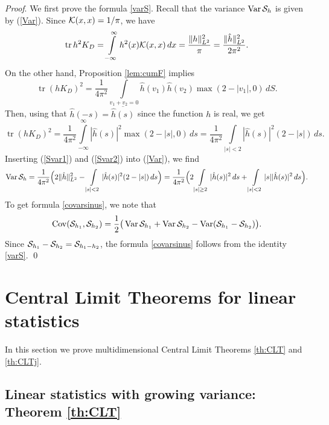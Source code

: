 \documentclass{article}
\numberwithin{equation}{section}
\newcommand{\SSS}{{\cal S}}
\newcommand{\KK}{{\cal K}}
\newcommand{\tr}{\operatorname{tr}}
\newcommand{\Cov}{\operatorname{Cov}}
\newcommand{\Var}{\operatorname{Var}}
\newcommand{\ov}{\overline}
\newcommand{\fr}{\frac}
\newcommand{\ili}{\int\limits}
\newcommand{\ilif}{\ili_{-\infty}^\infty}
\newcommand{\lbl}{\label}
\newcommand{\bee}{\begin{equation}}
\newcommand{\eee}{\end{equation}}
\begin{document}
{\it Proof}. We first prove the formula \eqref{varS}. Recall that the variance $\Var\SSS_{h}$ is given by (\ref{Var}).
Since $\KK(x,x)=1/\pi$, we have
\bee\lbl{Svar1}
\tr h^2 K_D=\ilif h^2(x)\KK(x,x)\,dx=\fr{\|h\|^2_{L^2}}{\pi} = \fr{\|\hat h\|^2_{L^2}}{2\pi^2}.
\eee
On the other hand, Proposition \ref{lem:cumF} implies
$$
\tr (h K_D)^2 = \fr{1}{4\pi^2} \ili_{v_1+v_2=0}\hat h(v_1)\hat h(v_2) \max (2-|v_1|,0)\, dS.
$$
Then, using that $\hat h(-s)=\ov{\hat h(s)}$ since the function $h$ is real, we get
\bee\lbl{Svar2}
\tr (h K_D)^2
=\fr{1}{4\pi^2}\ili_{-\infty}^\infty |\hat h(s)|^2 \max(2-|s|,0) \, ds
= \fr{1}{4\pi^2}\ili_{|s|<2} |\hat h(s)|^2 (2-|s|) \, ds.
\eee
Inserting (\ref{Svar1}) and (\ref{Svar2}) into  (\ref{Var}), we find
$$
\Var\SSS_{h}
= \fr{1}{4\pi^2}
\Big(
2\|\hat h\|^2_{L^2} - \ili_{|s|<2} |\hat h(s)|^2 (2-|s|) \, ds
\Big)
=\fr{1}{4\pi^2}
\Big(
2 \ili_{|s|\geq 2} |\hat h(s)|^2  \, ds + \ili_{|s|<2} |s| |\hat h(s)|^2  \, ds
\Big).
$$
To get formula  \eqref{covarsinus}, we note that
$$
\Cov(\SSS_{h_1},\SSS_{h_2})=
\fr12\big(\Var \SSS_{h_1} + \Var \SSS_{h_2} - \Var(\SSS_{h_1}-\SSS_{h_2}) \big).
$$
Since $\SSS_{h_1}-\SSS_{h_2}=\SSS_{h_1-h_2}$, 
the formula \eqref{covarsinus} follows from the identity \eqref{varS}.
\qed


\section{Central Limit Theorems for linear statistics}
\lbl{sec:CLTgen}
In this section we prove multidimensional Central Limit Theorems
\nolinebreak \ref{th:CLT} and \ref{th:CLTj}.


\subsection{Linear statistics with growing variance: Theorem \ref{th:CLT}}
\lbl{sec:CLT}
\end{document}
